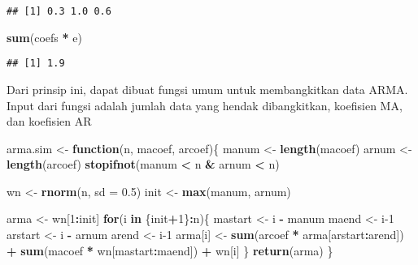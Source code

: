 \documentclass[
]{article}
\newenvironment{Shaded}{\begin{snugshade}}{\end{snugshade}}
\newcommand{\AttributeTok}[1]{\textcolor[rgb]{0.13,0.29,0.53}{#1}}
\newcommand{\ControlFlowTok}[1]{\textcolor[rgb]{0.13,0.29,0.53}{\textbf{#1}}}
\newcommand{\DecValTok}[1]{\textcolor[rgb]{0.00,0.00,0.81}{#1}}
\newcommand{\FloatTok}[1]{\textcolor[rgb]{0.00,0.00,0.81}{#1}}
\newcommand{\FunctionTok}[1]{\textcolor[rgb]{0.13,0.29,0.53}{\textbf{#1}}}
\newcommand{\NormalTok}[1]{#1}
\newcommand{\OtherTok}[1]{\textcolor[rgb]{0.56,0.35,0.01}{#1}}
\newcommand{\SpecialCharTok}[1]{\textcolor[rgb]{0.81,0.36,0.00}{\textbf{#1}}}
\begin{document}
\begin{verbatim}
## [1] 0.3 1.0 0.6
\end{verbatim}

\begin{Shaded}
\begin{Highlighting}[]
\FunctionTok{sum}\NormalTok{(coefs }\SpecialCharTok{*}\NormalTok{ e)}
\end{Highlighting}
\end{Shaded}

\begin{verbatim}
## [1] 1.9
\end{verbatim}

Dari prinsip ini, dapat dibuat fungsi umum untuk membangkitkan data
ARMA. Input dari fungsi adalah jumlah data yang hendak dibangkitkan,
koefisien MA, dan koefisien AR

\begin{Shaded}
\begin{Highlighting}[]
\NormalTok{arma.sim }\OtherTok{\textless{}{-}} \ControlFlowTok{function}\NormalTok{(n, macoef, arcoef)\{}
\NormalTok{  manum }\OtherTok{\textless{}{-}} \FunctionTok{length}\NormalTok{(macoef)}
\NormalTok{  arnum }\OtherTok{\textless{}{-}} \FunctionTok{length}\NormalTok{(arcoef)}
  \FunctionTok{stopifnot}\NormalTok{(manum }\SpecialCharTok{\textless{}}\NormalTok{ n }\SpecialCharTok{\&}\NormalTok{ arnum }\SpecialCharTok{\textless{}}\NormalTok{ n)}
  
\NormalTok{  wn }\OtherTok{\textless{}{-}} \FunctionTok{rnorm}\NormalTok{(n, }\AttributeTok{sd =} \FloatTok{0.5}\NormalTok{)}
\NormalTok{  init }\OtherTok{\textless{}{-}} \FunctionTok{max}\NormalTok{(manum, arnum)}

\NormalTok{  arma }\OtherTok{\textless{}{-}}\NormalTok{ wn[}\DecValTok{1}\SpecialCharTok{:}\NormalTok{init]}
  \ControlFlowTok{for}\NormalTok{(i }\ControlFlowTok{in}\NormalTok{ \{init}\SpecialCharTok{+}\DecValTok{1}\NormalTok{\}}\SpecialCharTok{:}\NormalTok{n)\{}
\NormalTok{   mastart }\OtherTok{\textless{}{-}}\NormalTok{ i }\SpecialCharTok{{-}}\NormalTok{ manum}
\NormalTok{   maend }\OtherTok{\textless{}{-}}\NormalTok{ i}\DecValTok{{-}1}
\NormalTok{   arstart }\OtherTok{\textless{}{-}}\NormalTok{ i }\SpecialCharTok{{-}}\NormalTok{ arnum}
\NormalTok{   arend }\OtherTok{\textless{}{-}}\NormalTok{ i}\DecValTok{{-}1}
\NormalTok{   arma[i] }\OtherTok{\textless{}{-}} \FunctionTok{sum}\NormalTok{(arcoef }\SpecialCharTok{*}\NormalTok{ arma[arstart}\SpecialCharTok{:}\NormalTok{arend]) }\SpecialCharTok{+} \FunctionTok{sum}\NormalTok{(macoef }\SpecialCharTok{*}\NormalTok{ wn[mastart}\SpecialCharTok{:}\NormalTok{maend])  }\SpecialCharTok{+}\NormalTok{ wn[i]}
\NormalTok{   \}}
  \FunctionTok{return}\NormalTok{(arma)}
\NormalTok{\}}
\end{Highlighting}
\end{Shaded}
\end{document}
